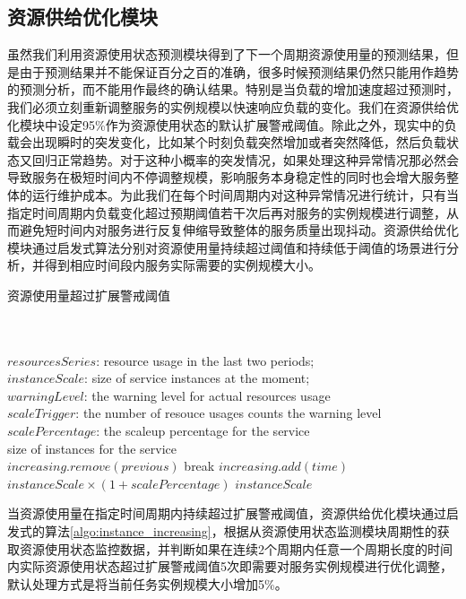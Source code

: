 \subsection{资源供给优化模块}\label{sec:provision_react}
虽然我们利用资源使用状态预测模块得到了下一个周期资源使用量的预测结果，但是由于预测结果并不能保证百分之百的准确，很多时候预测结果仍然只能用作趋势的预测分析，而不能用作最终的确认结果。特别是当负载的增加速度超过预测时，我们必须立刻重新调整服务的实例规模以快速响应负载的变化。我们在资源供给优化模块中设定95\%作为资源使用状态的默认扩展警戒阈值。除此之外，现实中的负载会出现瞬时的突发变化，比如某个时刻负载突然增加或者突然降低，然后负载状态又回归正常趋势。对于这种小概率的突发情况，如果处理这种异常情况那必然会导致服务在极短时间内不停调整规模，影响服务本身稳定性的同时也会增大服务整体的运行维护成本。为此我们在每个时间周期内对这种异常情况进行统计，只有当指定时间周期内负载变化超过预期阈值若干次后再对服务的实例规模进行调整，从而避免短时间内对服务进行反复伸缩导致整体的服务质量出现抖动。资源供给优化模块通过启发式算法分别对资源使用量持续超过阈值和持续低于阈值的场景进行分析，并得到相应时间段内服务实际需要的实例规模大小。

\begin{algorithm}[H]
\caption{资源使用量超过扩展警戒阈值}
\label{algo:instance_increasing}
\begin{algorithmic}[0]
\\
\Require ~~\
\\
$resourcesSeries$: resource usage in the last two periods;\\
$instanceScale$: size of service instances at the moment;\\
$warningLevel$: the warning level for actual resources usage \\
$scaleTrigger$: the number of resouce usages counts the warning level \\
$scalePercentage$: the scaleup percentage for the service
\Ensure ~~\
\\
size of instances for the service \\

                \If{$previous$ and $time$ not in a period}
                    \State $increasing.remove(previous)$
                \Else
                    \State break
                \EndIf
            \EndFor
            \State $increasing.add(time)$
        \EndIf
            \State \Return $instanceScale \times (1+scalePercentage)$
        \EndIf
    \EndFor
\EndFor
\State \Return $instanceScale$
\end{algorithmic}
\end{algorithm}
当资源使用量在指定时间周期内持续超过扩展警戒阈值，资源供给优化模块通过启发式的算法\ref{algo:instance_increasing}，根据从资源使用状态监测模块周期性的获取资源使用状态监控数据，并判断如果在连续2个周期内任意一个周期长度的时间内实际资源使用状态超过扩展警戒阈值5次即需要对服务实例规模进行优化调整，默认处理方式是将当前任务实例规模大小增加5\%。


